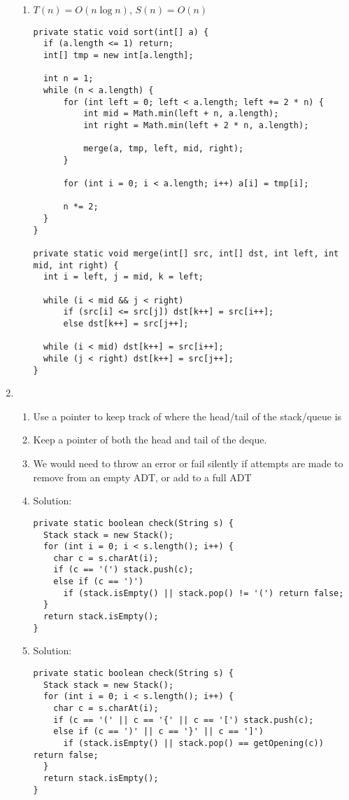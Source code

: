 \documentclass[12pt, a4paper]{article}
\begin{document}
\begin{enumerate}[Q\arabic*.]
\begin{enumerate}[(\alph*.)]
      \item $T(n) = O(n\log n)$, $S(n) = O(n)$ 
        \begin{lstlisting}
private static void sort(int[] a) {
  if (a.length <= 1) return;
  int[] tmp = new int[a.length];

  int n = 1;
  while (n < a.length) {
      for (int left = 0; left < a.length; left += 2 * n) {
          int mid = Math.min(left + n, a.length);
          int right = Math.min(left + 2 * n, a.length);

          merge(a, tmp, left, mid, right);
      }

      for (int i = 0; i < a.length; i++) a[i] = tmp[i];

      n *= 2;
  }
}

private static void merge(int[] src, int[] dst, int left, int mid, int right) {
  int i = left, j = mid, k = left;

  while (i < mid && j < right)
      if (src[i] <= src[j]) dst[k++] = src[i++];
      else dst[k++] = src[j++];

  while (i < mid) dst[k++] = src[i++];
  while (j < right) dst[k++] = src[j++];
}
        \end{lstlisting}
    \end{enumerate}

  \pagebreak
  \item 
    \begin{enumerate}[(\alph*.)]
      \item Use a pointer to keep track of where the head/tail of the stack/queue is 

      \item Keep a pointer of both the head and tail of the deque.

      \item We would need to throw an error or fail silently if attempts are made to remove from an empty ADT, or add to a full ADT

      \item Solution:
        \begin{lstlisting}
private static boolean check(String s) {
  Stack stack = new Stack();
  for (int i = 0; i < s.length(); i++) {
    char c = s.charAt(i);
    if (c == '(') stack.push(c);
    else if (c == ')')
      if (stack.isEmpty() || stack.pop() != '(') return false;
  }
  return stack.isEmpty();
}
        \end{lstlisting}

      \item Solution:
        \begin{lstlisting}
private static boolean check(String s) {
  Stack stack = new Stack();
  for (int i = 0; i < s.length(); i++) {
    char c = s.charAt(i);
    if (c == '(' || c == '{' || c == '[') stack.push(c);
    else if (c == ')' || c == '}' || c == ']')
      if (stack.isEmpty() || stack.pop() == getOpening(c)) return false;
  }
  return stack.isEmpty();
}


\end{lstlisting}
\end{enumerate}
\end{enumerate}
\end{document}
